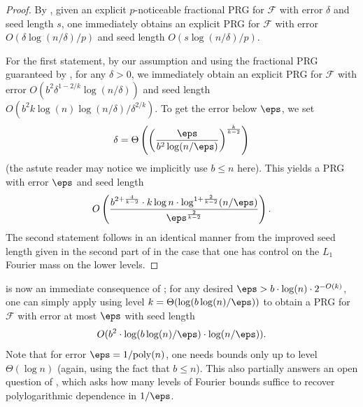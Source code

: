 \begin{proof}
By  , given an explicit $p$-noticeable fractional PRG for $\mathcal{F}$ with error $\delta$ and seed length $s$, one immediately obtains an explicit PRG for $\mathcal{F}$ with error $O(\delta \log(n/\delta)/p)$ and seed length $O(s\log(n/\delta)/p)$. 

For the first statement, by our assumption and using the fractional PRG guaranteed by   , for any $\delta>0$, we immediately obtain an explicit PRG for $\mathcal{F}$ with error $O(b^2 \delta^{1-2/k}\log(n/\delta))$ and seed length $O(b^2 k\log(n)\log(n/\delta)/\delta^{2/k})$. To get the error below $\eps$, we set
\begin{equation*}
    \delta = \Theta\left(\left(\frac{\eps}{b^2 \log(n/\eps)}\right)^{\frac{k}{k-2}}\right)
\end{equation*}
(the astute reader may notice we implicitly use $b\leq n$ here). This yields a PRG with error $\eps$ and seed length
\begin{equation*}
    O\left(\frac{b^{2+\frac{4}{k-2}}\cdot k \log n \cdot \log^{1+\frac{2}{k-2}}(n/\eps)}{\eps^{\frac{2}{k-2}}}\right).
\end{equation*}
The second statement follows in an identical manner from the improved seed length given in the second part of  in the case that one has control on the $L_1$ Fourier mass on the lower levels.
\end{proof}
 is now an immediate consequence of ; for any desired $\eps > b\cdot \log(n)\cdot 2^{-O(k)}$, one can simply apply  using level $k = \Theta(\log(b\log(n)/\eps))$ to obtain a PRG for $\mathcal{F}$ with error at most $\eps$ with seed length 
\begin{equation*}
    O(b^2\cdot \log(b\log( n)/\eps)\cdot \log(n/\eps)).
\end{equation*}
Note that for error $\eps = 1/\mathrm{poly}(n)$, one needs bounds only up to level $\Theta(\log n)$ (again, using the fact that $b\leq n$). This also partially answers an open question of \cite{CHLT}, which asks how many levels of Fourier bounds suffice to recover polylogarithmic dependence in $1/\eps$.


